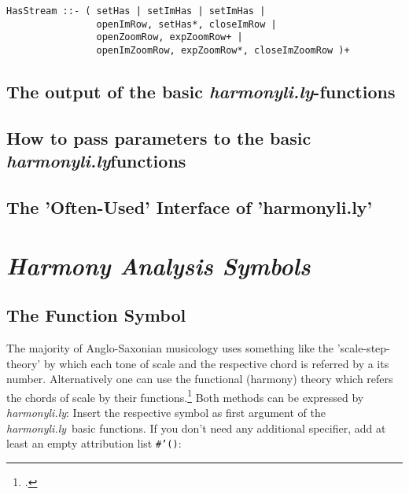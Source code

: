 \documentclass[
  DIV=calc,
  BCOR=5mm,
  12pt,
  headings=small,
  oneside,
  abstract=true,
  toc=bib,
  xcolor=dvipsnames,
  openany,
  ngerman,english]{scrartcl}
\newcommand{\hlyn}[0]{\textit{harmonyli.ly}}
\newcommand{\has}[1]{\textit{Harmony Analysis Symbol#1}}
\begin{document}
\begin{verbatim}
HasStream ::- ( setHas | setImHas | setImHas |
                openImRow, setHas*, closeImRow |
                openZoomRow, expZoomRow+ |
                openImZoomRow, expZoomRow*, closeImZoomRow )+
\end{verbatim}

\subsection{The output of the basic \hlyn-functions}

\subsection{How to pass parameters to the basic \hlyn\-functions}

\subsection{The 'Often-Used' Interface of 'harmonyli.ly'}

\section{\has{s}}

\subsection{The Function Symbol}

The majority of Anglo-Saxonian musicology uses something like the
'scale-step-theory' by which each tone of scale and the respective chord is
referred by a its number. Alternatively one can use the functional (harmony)
theory which refers the chords of scale by their functions.\footcite[for dedails
cf.][\nopage wp]{wpFunctionTheory2019a} Both methods can be expressed by \hlyn:
Insert the respective symbol as first argument of the \hlyn\ basic functions. If
you don't need any additional specifier, add at least an empty attribution list
\texttt{\#'()}:
\end{document}
